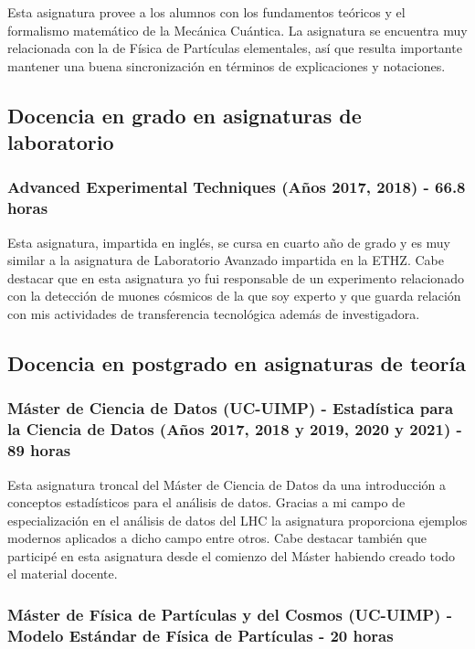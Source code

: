 Esta asignatura provee a los alumnos con los fundamentos teóricos y el formalismo matemático de la Mecánica Cuántica. La asignatura se encuentra muy relacionada con la de Física de Partículas elementales, así que resulta importante mantener una buena sincronización en términos de explicaciones y notaciones. 

\subsection{Docencia en grado en asignaturas de laboratorio}

\subsubsection{Advanced Experimental Techniques (Años 2017, 2018) - 66.8 horas}

Esta asignatura, impartida en inglés, se cursa en cuarto año de grado y es muy similar a la asignatura de Laboratorio Avanzado impartida en la ETHZ. Cabe destacar que en esta asignatura yo fui responsable de un experimento relacionado con la detección de muones cósmicos de la que soy experto y que guarda relación con mis actividades de transferencia tecnológica además de investigadora.

\subsection{Docencia en postgrado en asignaturas de teoría}

\subsubsection{Máster de Ciencia de Datos (UC-UIMP) - Estadística para la Ciencia de
Datos (Años 2017, 2018 y 2019, 2020 y 2021) - 89 horas}

Esta asignatura troncal del Máster de Ciencia de Datos da una introducción a conceptos estadísticos para el análisis de datos. Gracias a mi campo de especialización en
el análisis de datos del LHC la asignatura proporciona ejemplos modernos aplicados a dicho campo entre otros. Cabe destacar también que participé en esta asignatura desde el comienzo del Máster habiendo creado todo el material docente.

\subsubsection{Máster de Física de Partículas y del Cosmos (UC-UIMP) - Modelo Estándar de Física de Partículas - 20 horas}

